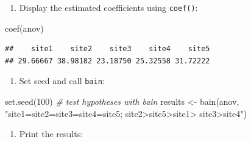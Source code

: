\documentclass[
]{book}
\newenvironment{Shaded}{\begin{snugshade}}{\end{snugshade}}
\newcommand{\CommentTok}[1]{\textcolor[rgb]{0.56,0.35,0.01}{\textit{#1}}}
\newcommand{\DecValTok}[1]{\textcolor[rgb]{0.00,0.00,0.81}{#1}}
\newcommand{\FunctionTok}[1]{\textcolor[rgb]{0.00,0.00,0.00}{#1}}
\newcommand{\NormalTok}[1]{#1}
\newcommand{\OtherTok}[1]{\textcolor[rgb]{0.56,0.35,0.01}{#1}}
\newcommand{\SpecialCharTok}[1]{\textcolor[rgb]{0.00,0.00,0.00}{#1}}
\newcommand{\StringTok}[1]{\textcolor[rgb]{0.31,0.60,0.02}{#1}}
\providecommand{\tightlist}{%
  \setlength{\itemsep}{0pt}\setlength{\parskip}{0pt}}
\begin{document}
\begin{Shaded}
\end{Shaded}

\begin{enumerate}
\def\labelenumi{\arabic{enumi})}
\setcounter{enumi}{1}
\tightlist
\item
  Display the estimated coefficients using \texttt{coef()}:
\end{enumerate}

\begin{Shaded}
\begin{Highlighting}[]
\FunctionTok{coef}\NormalTok{(anov)}
\end{Highlighting}
\end{Shaded}

\begin{verbatim}
##    site1    site2    site3    site4    site5 
## 29.66667 38.98182 23.18750 25.32558 31.72222
\end{verbatim}

\begin{enumerate}
\def\labelenumi{\arabic{enumi})}
\setcounter{enumi}{2}
\tightlist
\item
  Set seed and call \texttt{bain}:
\end{enumerate}

\begin{Shaded}
\begin{Highlighting}[]
\FunctionTok{set.seed}\NormalTok{(}\DecValTok{100}\NormalTok{)}
\CommentTok{\# test hypotheses with bain}
\NormalTok{results }\OtherTok{\textless{}{-}} \FunctionTok{bain}\NormalTok{(anov, }\StringTok{"site1=site2=site3=site4=site5; site2\textgreater{}site5\textgreater{}site1\textgreater{}}
\StringTok{site3\textgreater{}site4"}\NormalTok{)}
\end{Highlighting}
\end{Shaded}

\begin{enumerate}
\def\labelenumi{\arabic{enumi})}
\setcounter{enumi}{3}
\tightlist
\item
  Print the results:
\end{enumerate}
\end{document}
